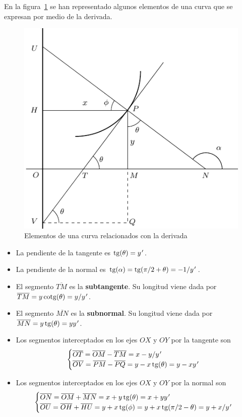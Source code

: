 En la figura~\ref{figcurva} se han representado algunos elementos
de una curva que se expresan por medio de la derivada.

\begin{figure}[H]
\centering \includegraphics[scale=0.8]{21_home_antalcides_Calculo_pdf_rtan.pdf}\caption{\label{figcurva}{\small{}{Elementos de una curva relacionados con
la derivada}}}
\end{figure}

\begin{itemize}
\item La pendiente de la tangente es $\operatorname{tg}(\theta)=y\mbox{$^{\mspace{2mu}\prime}$}$. 
\item La pendiente de la normal es $\operatorname{tg}(\alpha)=\operatorname{tg}(\pi/2+\theta)=-1/y\mbox{$^{\mspace{2mu}\prime}$}$. 
\item El segmento $\overline{TM}$ es la \textbf{subtangente}. Su longitud
viene dada por $\overline{TM}=y\operatorname{cotg}(\theta)=y/y\mbox{$^{\mspace{2mu}\prime}$}$. 
\item El segmento $\overline{MN}$ es la \textbf{subnormal}. Su longitud
viene dada por $\overline{MN}=y\operatorname{tg}(\theta)=yy\mbox{$^{\mspace{2mu}\prime}$}$. 
\item Los segmentos interceptados en los ejes $OX$ y $OY$ por la tangente
son 
\[
\begin{cases}
\overline{OT}=\overline{OM}-\overline{TM}=x-y/y\mbox{$^{\mspace{2mu}\prime}$}\\
\overline{OV}=\overline{PM}-\overline{PQ}=y-x\operatorname{tg}(\theta)=y-xy\mbox{$^{\mspace{2mu}\prime}$}
\end{cases}
\]
\item Los segmentos interceptados en los ejes $OX$ y $OY$ por la normal
son 
\[
\begin{cases}
\overline{ON}=\overline{OM}+\overline{MN}=x+y\operatorname{tg}(\theta)=x+yy\mbox{$^{\mspace{2mu}\prime}$}\\
\overline{OU}=\overline{OH}+\overline{HU}=y+x\operatorname{tg}(\phi)=y+x\operatorname{tg}(\pi/2-\theta)=y+x/y\mbox{$^{\mspace{2mu}\prime}$}
\end{cases}
\]
\end{itemize}

